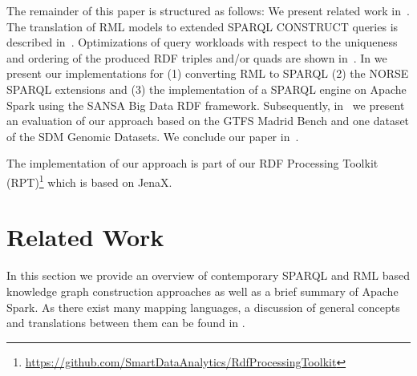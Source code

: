 The remainder of this paper is structured as follows:
We present related work
in~.
The translation of RML models to extended SPARQL CONSTRUCT queries is described in~.
Optimizations of query workloads with respect to the uniqueness and ordering of the produced RDF triples and/or quads are shown in~.
In  we present our implementations for (1) converting RML to SPARQL (2) the NORSE SPARQL extensions
and (3) the implementation of a SPARQL engine on Apache Spark using the SANSA Big Data RDF framework.
Subsequently, in~ we present an evaluation of our approach based on the GTFS Madrid Bench and one dataset of the SDM Genomic Datasets.
We conclude our paper in~.

The implementation of our approach is part of our RDF Processing Toolkit (RPT)\footnote{\url{https://github.com/SmartDataAnalytics/RdfProcessingToolkit}} which is based on JenaX.


\section{Related Work}
\label{sec:related-work}
In this section we provide an overview of contemporary SPARQL and RML based knowledge graph construction approaches
as well as a brief summary of Apache Spark.
As there exist many mapping languages\cite{Meester2019, ChavesFraga2021, IglesiasMolina2022a, Assche2023}, a discussion of general concepts and translations between them can be found in \cite{Corcho2020, IglesiasMolina2022}.



